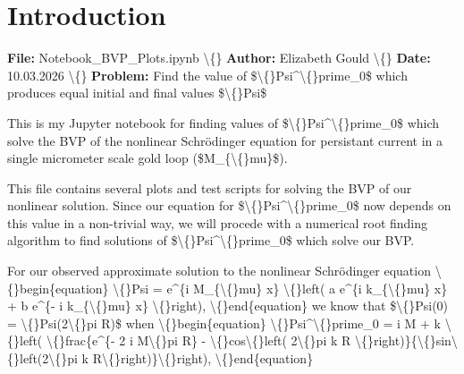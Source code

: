 \documentclass{article}
\begin{document}
\section{Introduction}


\textbf{File:} Notebook\_BVP\_Plots.ipynb 
\textbackslash\{\}
\textbf{Author:} Elizabeth Gould
\textbackslash\{\}
\textbf{Date:} 10.03.2026
\textbackslash\{\}
\textbf{Problem:} Find the value of \$\textbackslash\{\}Psi\textasciicircum{}\textbackslash\{\}prime\_0\$ which produces equal initial and final values \$\textbackslash\{\}Psi\$

This is my Jupyter notebook for finding values of \$\textbackslash\{\}Psi\textasciicircum{}\textbackslash\{\}prime\_0\$ which solve the BVP of the nonlinear Schr\"{o}dinger equation for persistant current in a single micrometer scale gold loop (\$M\_\{\textbackslash\{\}mu\}\$). 

This file contains several plots and test scripts for solving the BVP of our nonlinear solution. Since our equation for \$\textbackslash\{\}Psi\textasciicircum{}\textbackslash\{\}prime\_0\$ now depends on this value in a non-trivial way, we will procede with a numerical root finding algorithm to find solutions of \$\textbackslash\{\}Psi\textasciicircum{}\textbackslash\{\}prime\_0\$ which solve our BVP.

For our observed approximate solution to the nonlinear Schr\"{o}dinger equation
\textbackslash\{\}begin\{equation\}
\textbackslash\{\}Psi = e\textasciicircum{}\{i M\_\{\textbackslash\{\}mu\} x\} \textbackslash\{\}left( a e\textasciicircum{}\{i k\_\{\textbackslash\{\}mu\} x\} + b e\textasciicircum{}\{- i k\_\{\textbackslash\{\}mu\} x\} \textbackslash\{\}right),
\textbackslash\{\}end\{equation\}
we know that \$\textbackslash\{\}Psi(0) = \textbackslash\{\}Psi(2\textbackslash\{\}pi R)\$ when 
\textbackslash\{\}begin\{equation\}
\textbackslash\{\}Psi\textasciicircum{}\textbackslash\{\}prime\_0 = i M + k \textbackslash\{\}left( \textbackslash\{\}frac\{e\textasciicircum{}\{- 2 i M\textbackslash\{\}pi R\} - \textbackslash\{\}cos\textbackslash\{\}left( 2\textbackslash\{\}pi k R \textbackslash\{\}right)\}\{\textbackslash\{\}sin\textbackslash\{\}left(2\textbackslash\{\}pi k R\textbackslash\{\}right)\}\textbackslash\{\}right),
\textbackslash\{\}end\{equation\}
\end{document}
